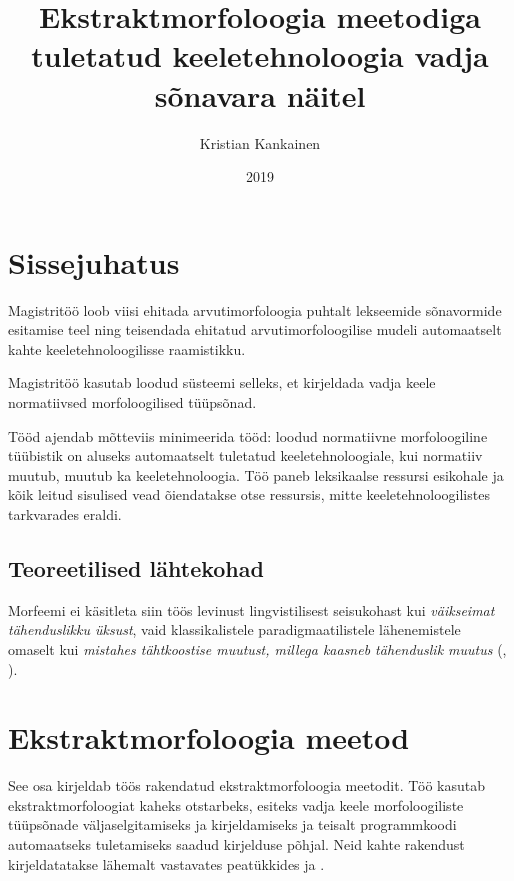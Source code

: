 \documentclass[12pt,a4paper]{article}
\begin{document}
\title{Ekstraktmorfoloogia meetodiga tuletatud keeletehnoloogia vadja sõnavara näitel}
\author{Kristian Kankainen}
\date{2019}
\maketitle


\newpage
\tableofcontents



\newpage
{}
\section{Sissejuhatus}

Magistritöö loob viisi ehitada arvutimorfoloogia puhtalt lekseemide sõnavormide esitamise teel ning teisendada ehitatud arvutimorfoloogilise mudeli automaatselt kahte keeletehnoloogilisse raamistikku.

Magistritöö kasutab loodud süsteemi selleks, et kirjeldada vadja keele normatiivsed morfoloogilised tüüpsõnad.

Tööd ajendab mõtteviis minimeerida tööd: loodud normatiivne morfoloogiline tüübistik on aluseks automaatselt tuletatud keeletehnoloogiale, kui normatiiv muutub, muutub ka keeletehnoloogia. Töö paneb leksikaalse ressursi esikohale ja kõik leitud sisulised vead õiendatakse otse ressursis, mitte keeletehnoloogilistes tarkvarades eraldi.




\subsection{Teoreetilised lähtekohad}

Morfeemi ei käsitleta siin töös levinust lingvistilisest seisukohast kui \textit{väikseimat tähenduslikku üksust}, vaid klassikalistele paradigmaatilistele lähenemistele omaselt kui \textit{mistahes tähtkoostise muutust, millega kaasneb tähenduslik muutus} (\cite{beard_morpheme_1987}, \cite{beard_lexeme-morpheme_1995}).




\newpage
\section{Ekstraktmorfoloogia meetod}
\label{sec:ekstraktmorfoloogia-meetod}
See osa kirjeldab töös rakendatud ekstraktmorfoloogia meetodit. Töö kasutab ekstraktmorfoloogiat kaheks otstarbeks, esiteks vadja keele morfoloogiliste tüüpsõnade väljaselgitamiseks ja kirjeldamiseks ja teisalt programmkoodi automaatseks tuletamiseks saadud kirjelduse põhjal. Neid kahte rakendust kirjeldatatakse lähemalt vastavates peatükkides \textit{} ja \textit{}.
\end{document}
